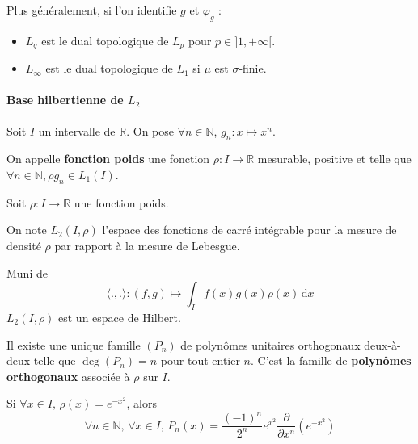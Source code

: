 
	\begin{remark}
		Plus généralement, si l'on identifie $g$ et $\varphi_g$ :
		\begin{itemize}
			\item $L_q$ est le dual topologique de $L_p$ pour $p \in ]1, +\infty[$.
			\item $L_\infty$ est le dual topologique de $L_1$ si $\mu$ est $\sigma$-finie.
		\end{itemize}
	\end{remark}

	\paragraph{Base hilbertienne de \texorpdfstring{$L_2$}{L₂}}


	Soit $I$ un intervalle de $\mathbb{R}$. On pose $\forall n \in \mathbb{N}$, $g_n : x \mapsto x^n$.

	\begin{definition}
		On appelle \textbf{fonction poids} une fonction $\rho : I \rightarrow \mathbb{R}$ mesurable, positive et telle que $\forall n \in \mathbb{N}, \rho g_n \in L_1(I)$.
	\end{definition}

	Soit $\rho : I \rightarrow \mathbb{R}$ une fonction poids.

	\begin{notation}
		On note $L_2(I, \rho)$ l'espace des fonctions de carré intégrable pour la mesure de densité $\rho$ par rapport à la mesure de Lebesgue.
	\end{notation}

	\begin{proposition}
		Muni de
		\[ \langle ., . \rangle : (f,g) \mapsto \int_I f(x) \overline{g(x)} \rho(x) \, \mathrm{d}x \]
		$L_2(I, \rho)$ est un espace de Hilbert.
	\end{proposition}

	\begin{theorem}
		Il existe une unique famille $(P_n)$ de polynômes unitaires orthogonaux deux-à-deux telle que $\deg(P_n) = n$ pour tout entier $n$. C'est la famille de \textbf{polynômes orthogonaux} associée à $\rho$ sur $I$.
	\end{theorem}

	\begin{example}
		Si $\forall x \in I, \, \rho(x) = e^{-x^2}$, alors
		\[ \forall n \in \mathbb{N}, \, \forall x \in I, \, P_n(x) = \frac{(-1)^n}{2^n} e^{x^2} \frac{\partial}{\partial x^n} \left( e^{-x^2} \right) \]
	\end{example}

